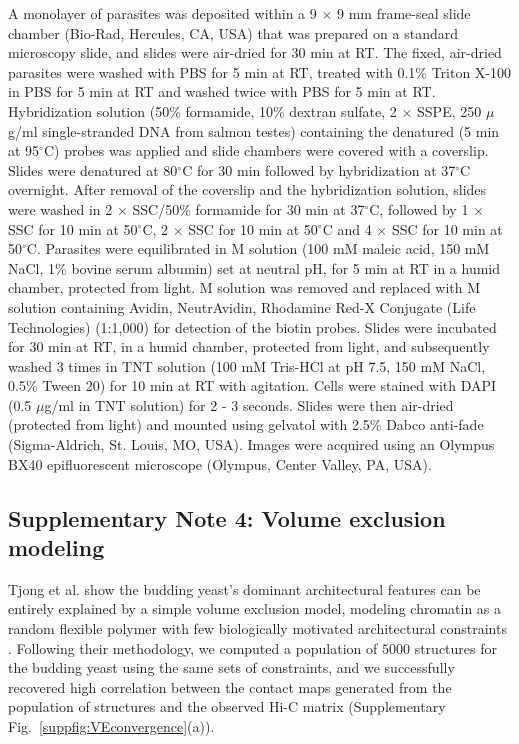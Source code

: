 A monolayer of parasites was deposited within a 9 $\times$ 9 mm frame-seal slide chamber (Bio-Rad, Hercules, CA, USA) that was prepared on a standard microscopy slide, and slides were air-dried for 30 min at RT. The fixed, air-dried parasites were washed with PBS for 5 min at RT, treated with 0.1\% Triton X-100 in PBS for 5 min at RT and washed twice with PBS for 5 min at RT. Hybridization solution (50\% formamide, 10\% dextran sulfate, 2 $\times$ SSPE, 250 $\mu$g/ml single-stranded DNA from salmon testes) containing the denatured (5 min at 95$^\circ$C) probes was applied and slide chambers were covered with a coverslip. Slides were denatured at 80$^\circ$C for 30 min followed by hybridization at 37$^\circ$C overnight. After removal of the coverslip and the hybridization solution, slides were washed in 2 $\times$ SSC/50\% formamide for 30 min at 37$^\circ$C, followed by 1 $\times$ SSC for 10 min at 50$^\circ$C, 2 $\times$ SSC for 10 min at 50$^\circ$C and 4 $\times$ SSC for 10 min at 50$^\circ$C. Parasites were equilibrated in M solution (100 mM maleic acid, 150 mM NaCl, 1\% bovine serum albumin) set at neutral pH, for 5 min at RT in a humid chamber, protected from light. M solution was removed and replaced with M solution containing Avidin, NeutrAvidin, Rhodamine Red-X Conjugate (Life Technologies) (1:1,000) for detection of the biotin probes. Slides were incubated for 30 min at RT, in a humid chamber, protected from light, and subsequently washed 3 times in TNT solution (100 mM Tris-HCl at pH 7.5, 150 mM NaCl, 0.5\% Tween 20) for 10 min at RT with agitation. Cells were stained with DAPI (0.5 $\mu$g/ml in TNT solution) for 2 - 3  seconds. Slides were then air-dried (protected from light) and mounted using gelvatol with 2.5\% Dabco anti-fade (Sigma-Aldrich, St. Louis, MO, USA). Images were acquired using an Olympus BX40 epifluorescent microscope (Olympus, Center Valley, PA, USA).


\subsection*{Supplementary Note 4: Volume exclusion modeling}
\label{supp:volume-exclusion}

Tjong et al. show the budding yeast's dominant architectural features
can be entirely explained by a simple volume exclusion model, modeling
chromatin as a random flexible polymer with few biologically motivated
architectural constraints \cite{tjong:physical}. Following their
methodology, we computed a population of $5000$ structures for the
budding yeast using the same sets of constraints, and we successfully
recovered high correlation between the contact maps
generated from the population of structures and the observed Hi-C
matrix (Supplementary Fig.~\ref{suppfig:VEconvergence}(a)).

